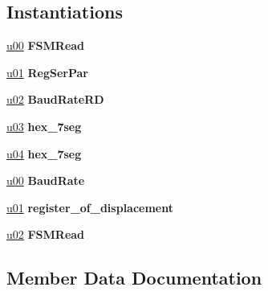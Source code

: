 \subsection*{Instantiations}
 \begin{DoxyCompactItemize}
\item 
\hyperlink{class_r_s232_read_1_1moore_a47c959174c33814179fa80cd86e9fdd1}{u00}  {\bfseries F\+S\+M\+Read}   
\item 
\hyperlink{class_r_s232_read_1_1moore_a261149681baa370af616d05085c60b21}{u01}  {\bfseries Reg\+Ser\+Par}   
\item 
\hyperlink{class_r_s232_read_1_1moore_a59af0c0173456dd2b8087a3882ac1a52}{u02}  {\bfseries Baud\+Rate\+R\+D}   
\item 
\hyperlink{class_r_s232_read_1_1moore_a18f0f105eb40d1848d58145647ae9c20}{u03}  {\bfseries hex\+\_\+7seg}   
\item 
\hyperlink{class_r_s232_read_1_1moore_a5280b1059f40a0cadd6bccddcb7705dd}{u04}  {\bfseries hex\+\_\+7seg}   
\item 
\hyperlink{class_r_s232_read_1_1moore_a47c959174c33814179fa80cd86e9fdd1}{u00}  {\bfseries Baud\+Rate}   
\item 
\hyperlink{class_r_s232_read_1_1moore_a261149681baa370af616d05085c60b21}{u01}  {\bfseries register\+\_\+of\+\_\+displacement}   
\item 
\hyperlink{class_r_s232_read_1_1moore_a59af0c0173456dd2b8087a3882ac1a52}{u02}  {\bfseries F\+S\+M\+Read}   
\end{DoxyCompactItemize}


\subsection{Member Data Documentation}
\hypertarget{class_r_s232_read_1_1moore_a7654bd82719bfde1c792d7828664dde2}{}
\subsubsection[{Baud\+Rate}]{ {\bfseries \textcolor{vhdlchar}{ }} \hspace{0.3cm}{\ttfamily [Component]}}\label{class_r_s232_read_1_1moore_a7654bd82719bfde1c792d7828664dde2}
\hypertarget{class_r_s232_read_1_1moore_a8c00d31ed1517acd6dc5539fb9313b42}{}
